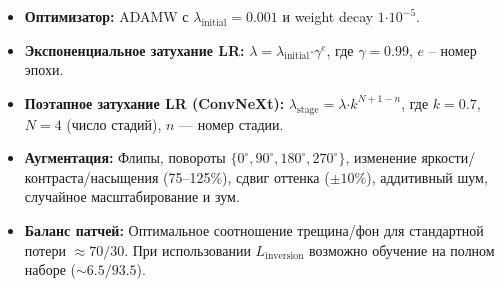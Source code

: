 \begin{itemize}
    \item \textbf{Оптимизатор:} ADAMW с $\lambda_{\text{initial}} = 0.001$ и weight decay $1 \mathord{\cdot} 10^{-5}$.
    \item \textbf{Экспоненциальное затухание LR:} $\lambda = \lambda_{\text{initial}} \mathord{\cdot} \gamma^e$, где $\gamma = 0.99$, $e$ -- номер эпохи.
    \item \textbf{Поэтапное затухание LR (ConvNeXt):} $\lambda_{\text{stage}} = \lambda \mathord{\cdot} k^{N+1-n}$, где $k=0.7$, $N=4$ (число стадий), $n$ --- номер стадии.
    \item \textbf{Аугментация:} Флипы, повороты $\{0^\circ, 90^\circ, 180^\circ, 270^\circ\}$, изменение яркости/контраста/насыщения (75--125\%), сдвиг оттенка ($\pm 10\%$), аддитивный шум, случайное масштабирование и зум.
    \item \textbf{Баланс патчей:} Оптимальное соотношение трещина/фон для стандартной потери $\approx 70/30$. При использовании $L_{\text{inversion}}$ возможно обучение на полном наборе ($\sim 6.5/93.5$).
\end{itemize}
